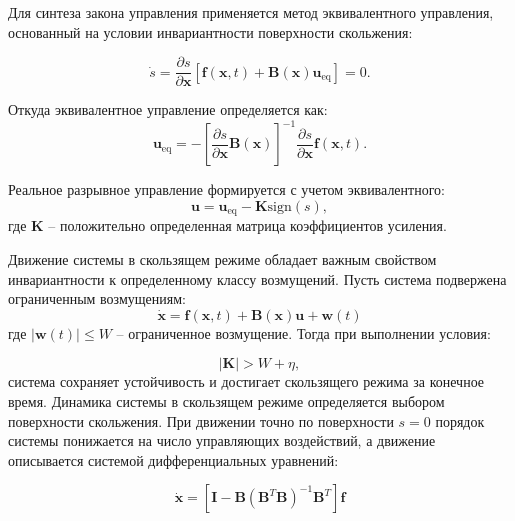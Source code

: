 Для синтеза закона управления применяется метод эквивалентного управления,
основанный на условии инвариантности поверхности скольжения:

\begin{equation*}
	\dot{s} = \frac{\partial s}{\partial \mathbf{x}}[\mathbf{f}(\mathbf{x}, t) + \mathbf{B}(\mathbf{x})\mathbf{u}_\text{eq}] = 0.
\end{equation*}

Откуда эквивалентное управление определяется как:
\begin{equation*}
	\mathbf{u}_\text{eq} = -\left[\frac{\partial s}{\partial \mathbf{x}}\mathbf{B}(\mathbf{x})\right]^{-1}\frac{\partial s}{\partial \mathbf{x}}\mathbf{f}(\mathbf{x}, t).
\end{equation*}

Реальное разрывное управление формируется с учетом эквивалентного:
\begin{equation*}
	\mathbf{u} = \mathbf{u}_\text{eq} - \mathbf{K}\text{sign}(s),
\end{equation*}
где $\mathbf{K}$ -- положительно определенная матрица коэффициентов усиления.

Движение системы в скользящем режиме обладает важным свойством инвариантности
к определенному классу возмущений. Пусть система подвержена ограниченным возмущениям:
\begin{equation*}
	\dot{\mathbf{x}} = \mathbf{f}(\mathbf{x}, t) + \mathbf{B}(\mathbf{x})\mathbf{u} + \mathbf{w}(t)
\end{equation*}
где $|\mathbf{w}(t)| \leq W$ -- ограниченное возмущение. Тогда при выполнении условия:

\begin{equation*}
	|\mathbf{K}| > W + \eta,
\end{equation*}
система сохраняет устойчивость и достигает скользящего режима за конечное время.
Динамика системы в скользящем режиме определяется выбором поверхности скольжения.
При движении точно по поверхности $s = 0$ порядок системы понижается на число
управляющих воздействий, а движение описывается системой дифференциальных уравнений:

\begin{equation*}
	\mathbf{\dot{x}} = [\mathbf{I} - \mathbf{B}(\mathbf{B}^T\mathbf{B})^{-1}\mathbf{B}^T]\mathbf{f}
\end{equation*}

